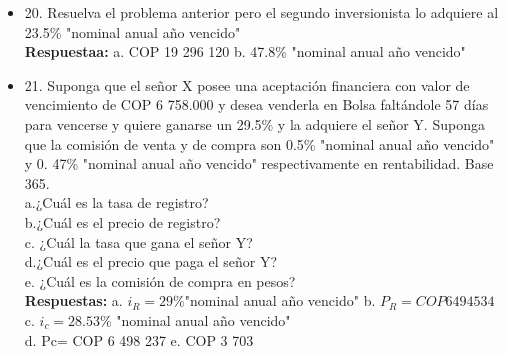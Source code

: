 \begin{itemize}
 \item 20. Resuelva el problema anterior pero el segundo inversionista lo adquiere al 23.5\% "nominal anual año vencido"\\
       \textbf{Respuestaa:} a. COP 19 296 120\hspace{1,0cm} b. 47.8\% "nominal anual año vencido"\\
       \medskip

 \item 21. Suponga que el señor X posee una aceptación financiera con valor de vencimiento de COP 6 758.000 y desea venderla en Bolsa faltándole 57 días para vencerse y quiere ganarse un 29.5\% y la adquiere el señor Y. Suponga que la comisión de venta y de compra son 0.5\% "nominal anual año vencido" y 0. 47\% "nominal anual año vencido" respectivamente en rentabilidad. Base 365.\\
       a.¿Cuál es la tasa de registro?\\
       b.¿Cuál es el precio de registro?\\
       c. ¿Cuál la tasa que gana el señor Y?\\
       d.¿Cuál es el precio que paga el señor Y?\\
       e. ¿Cuál es la comisión de compra en pesos?\\
       \textbf{Respuestas:} a. $i_{R}= 29\%$"nominal anual año vencido"\hspace{0,5cm} b. $P_{R} = COP 6 494 534$\hspace{0,5cm}  c. $i_{c} = 28.53\%$ "nominal anual año vencido"\hspace{0,5cm}\\
       d. Pc= COP 6 498 237 \hspace{0,5cm} e. COP 3 703\\
       \medskip


\end{itemize}
